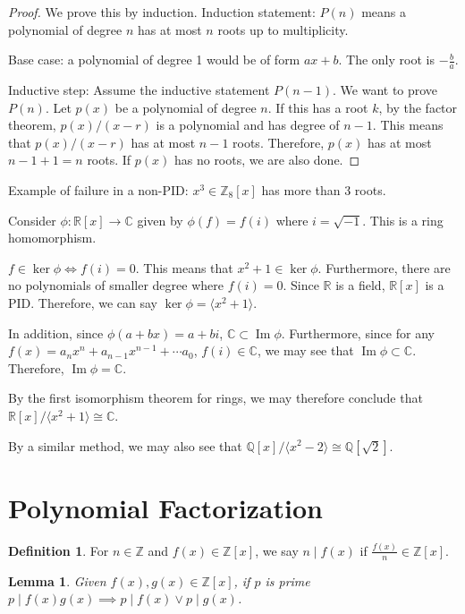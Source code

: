 \documentclass{article}
\theoremstyle{definition}
\newtheorem{definition}{Definition}
\theoremstyle{plain}
\theoremstyle{corollary}
\theoremstyle{lemma}
\newtheorem{lemma}{Lemma}
\DeclareMathOperator{\Img}{Im}
\begin{document}
\begin{proof}
    We prove this by induction. Induction statement: $P(n)$ means a polynomial of degree $n$ has at most $n$ roots up to multiplicity.

    Base case: a polynomial of degree 1 would be of form $ax+b$. The only root is $-\frac b a$.

    Inductive step: Assume the inductive statement $P(n-1)$. We want to prove $P(n)$. Let $p(x)$ be a polynomial of degree $n$. If this has a root $k$, by the factor theorem, $p(x)/(x-r)$ is a polynomial and has degree of $n-1$. This means that $p(x)/(x-r)$ has at most $n-1$ roots. Therefore, $p(x)$ has at most $n-1+1=n$ roots. If $p(x)$ has no roots, we are also done.
\end{proof}

Example of failure in a non-PID: $x^3\in\mathbb{Z}_8[x]$ has more than 3 roots.

Consider $\phi:\mathbb{R}[x]\rightarrow\mathbb{C}$ given by $\phi(f)=f(i)$ where $i=\sqrt{-1}$. This is a ring homomorphism. 

$f\in\ker\phi\iff f(i)=0$. This means that $x^2+1\in\ker\phi$. Furthermore, there are no polynomials of smaller degree where $f(i)=0$. Since $\mathbb{R}$ is a field, $\mathbb{R}[x]$ is a PID. Therefore, we can say $\ker\phi=\langle x^2+1\rangle$.

In addition, since $\phi(a+bx)=a+bi$, $\mathbb{C}\subset\Img\phi$. Furthermore, since for any $f(x)=a_nx^n+a_{n-1}x^{n-1}+\cdots a_0$, $f(i)\in\mathbb{C}$, we may see that $\Img\phi\subset\mathbb{C}$. Therefore, $\Img\phi=\mathbb{C}$.

By the first isomorphism theorem for rings, we may therefore conclude that $\mathbb{R}[x]/\langle x^2+1\rangle\cong\mathbb{C}$.

By a similar method, we may also see that $\mathbb{Q}[x]/\langle x^2-2\rangle\cong\mathbb{Q}[\sqrt2]$.

\section{Polynomial Factorization}

\begin{definition}
    For $n\in\mathbb{Z}$ and $f(x)\in\mathbb{Z}[x]$, we say $n\mid f(x)$ if $\frac{f(x)}n\in\mathbb{Z}[x]$.
\end{definition}

\begin{lemma}
    Given $f(x),g(x)\in\mathbb{Z}[x]$, if $p$ is prime $p\mid f(x)g(x)\implies p\mid f(x)\lor p\mid g(x)$.
\end{lemma}
\end{document}
